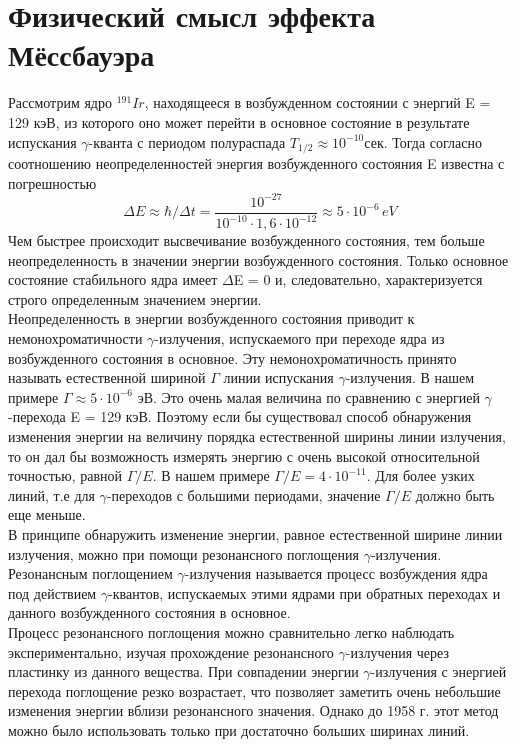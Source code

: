 \documentclass{article}
\begin{document}
\section{Физический смысл эффекта Мёссбауэра}
\hspace{12pt} Рассмотрим ядро $^{191}Ir$, находящееся в возбужденном состоянии с энергий E = 129 кэВ, из которого оно может перейти в основное состояние в результате испускания $\gamma$-кванта с периодом полураспада $T_{1/2} \approx 10^{-10}$сек. Тогда согласно соотношению неопределенностей энергия возбужденного состояния E известна с погрешностью $${\Delta}E \approx {\hbar}/{\Delta}t = \frac{10^{-27}}{10^{-10}\cdot 1,6 \cdot 10^{-12}} \approx 5 \cdot 10^{-6} \hspace{2pt}eV$$
\hspace{12pt}Чем быстрее происходит высвечивание возбужденного состояния, тем больше неопределенность в значении энергии возбужденного состояния. Только основное состояние стабильного ядра имеет $\Delta$E = 0 и, следовательно, характеризуется строго определенным значением энергии.
\\
\indent Неопределенность в энергии возбужденного состояния приводит к немонохроматичности $\gamma$-излучения, испускаемого при переходе ядра из возбужденного состояния в основное. Эту немонохроматичность принято называть естественной шириной $\Gamma$ линии испускания $\gamma$-излучения. В нашем примере $\Gamma \approx 5\cdot 10^{-6}$ эВ. Это очень малая величина по сравнению с энергией $\gamma$-перехода E = 129 кэВ. Поэтому если бы существовал способ обнаружения изменения энергии на величину порядка естественной ширины линии излучения, то он дал бы возможность измерять энергию с очень высокой относительной точностью, равной $\Gamma/E$. В нашем примере $\Gamma/E = 4\cdot 10^{-11}$. Для более узких линий, т.е для $\gamma$-переходов с большими периодами, значение $\Gamma/E$ должно быть еще меньше.
\\
\indent В принципе обнаружить изменение энергии, равное естественной ширине линии излучения, можно при помощи резонансного поглощения $\gamma$-излучения. Резонансным поглощением $\gamma$-излучения называется процесс возбуждения ядра под действием $\gamma$-квантов, испускаемых этими ядрами при обратных переходах и данного возбужденного состояния в основное.
\\
\indent Процесс резонансного поглощения можно сравнительно легко наблюдать экспериментально, изучая прохождение резонансного $\gamma$-излучения через пластинку из данного вещества. При совпадении энергии $\gamma$-излучения с энергией перехода поглощение резко возрастает, что позволяет заметить очень небольшие изменения энергии вблизи резонансного значения. Однако до 1958 г. этот метод можно было использовать только при достаточно больших ширинах линий.
\end{document}
